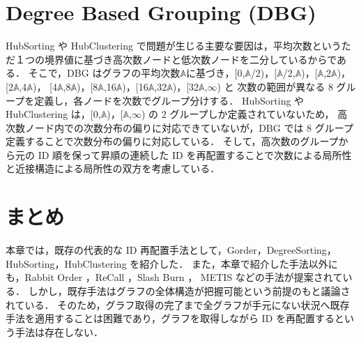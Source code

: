 \section{Degree Based Grouping (DBG)}
HubSorting や HubClustering で問題が生じる主要な要因は，平均次数というただ１つの境界値に基づき高次数ノードと低次数ノードを二分しているからである．
そこで，DBG \cite{faldu2019closer}はグラフの平均次数$\mathbb{A}$に基づき，[0,$\mathbb{A}$/2)，[$\mathbb{A}$/2,$\mathbb{A}$)，[$\mathbb{A}$,2$\mathbb{A}$)，[2$\mathbb{A}$,4$\mathbb{A}$)，
[4$\mathbb{A}$,8$\mathbb{A}$)，[8$\mathbb{A}$,16$\mathbb{A}$)，[16$\mathbb{A}$,32$\mathbb{A}$)，[32$\mathbb{A}$,$\infty$)
と 次数の範囲が異なる 8 グループを定義し，各ノードを次数でグループ分けする．
HubSorting や HubClustering は，[0,$\mathbb{A}$)，[$\mathbb{A}$,$\infty$) の 2 グループしか定義されていないため，
高次数ノード内での次数分布の偏りに対応できていないが，DBG では 8 グループ定義することで次数分布の偏りに対応している．
そして，高次数のグループから元の ID 順を保って昇順の連続した ID を再配置することで次数による局所性と近接構造による局所性の双方を考慮している．
\section{まとめ}
本章では，既存の代表的な ID 再配置手法として，Gorder，DegreeSorting，HubSorting，HubClustering を紹介した．
また，本章で紹介した手法以外にも，Rabbit Order \cite{arai2016rabbit}，ReCall \cite{lakhotia2017recall}，Slash Burn \cite{kang2011beyond}，
METIS \cite{karypis1998multilevelk} などの手法が提案されている．
しかし，既存手法はグラフの全体構造が把握可能という前提のもと議論されている．
そのため，グラフ取得の完了まで全グラフが手元にない状況へ既存手法を適用することは困難であり，グラフを取得しながら ID を再配置するという手法は存在しない．